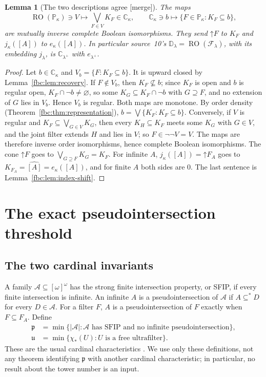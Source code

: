 \documentclass[11pt,letterpaper]{article}
\newtheorem{lemma}[theorem]{Lemma}
\theoremstyle{definition}
\theoremstyle{remark}
\newcommand{\om}{\omega}
\newcommand{\C}{\mathbb C}
\newcommand{\PP}{\mathbb P}
\newcommand{\cp}{\mathfrak p}
\newcommand{\cu}{\mathfrak u}
\newcommand{\up}{\mathord{\uparrow}}
\newcommand{\RO}{\operatorname{RO}}
\newcommand{\src}[1]{\textup{[#1]}}
\begin{document}
\begin{lemma}[The two descriptions agree \src{merge}]
\label{fbc:lem:dictionary}
The maps
\[
 \RO(\PP_\kappa)\ni V\longmapsto\bigvee_{F\in V}K_F\in\C_\kappa,
 \qquad
 \C_\kappa\ni b\longmapsto\{F\in\PP_\kappa:K_F\subseteq b\},
\]
are mutually inverse complete Boolean isomorphisms. They send $\up F$ to
$K_F$ and $j_\kappa([A])$ to $e_\kappa([A])$. In particular source~10's
$\mathbb D_\lambda=\RO(\mathcal F_\lambda)$, with its embedding
$j_\lambda$, is $\C_{\lambda^+}$ with $e_{\lambda^+}$.
\end{lemma}
\begin{proof}
Let $b\in\C_\kappa$ and $V_b=\{F:K_F\subseteq b\}$. It is upward closed
by Lemma~\ref{fbc:lem:recovery}. If $F\notin V_b$, then $K_F\nsubseteq b$;
since $K_F$ is open and $b$ is regular open, $K_F\cap\neg b\ne\varnothing$,
so some $K_G\subseteq K_F\cap\neg b$ with $G\supseteq F$, and no extension
of $G$ lies in $V_b$. Hence $V_b$ is regular. Both maps are monotone.
By order density (Theorem~\ref{fbc:thm:representation}),
$b=\bigvee\{K_F:K_F\subseteq b\}$. Conversely, if $V$ is regular and
$K_F\subseteq\bigvee_{G\in V}K_G$, then every $K_H\subseteq K_F$ meets
some $K_G$ with $G\in V$, and the joint filter extends $H$ and lies in
$V$; so $F\in\neg\neg V=V$. The maps are therefore inverse order
isomorphisms, hence complete Boolean isomorphisms. The cone $\up F$ goes
to $\bigvee_{G\supseteq F}K_G=K_F$. For infinite $A$,
$j_\kappa([A])=\up F_A$ goes to $K_{F_A}=\widehat{[A]}=e_\kappa([A])$, and
for finite $A$ both sides are $0$. The last sentence is
Lemma~\ref{fbc:lem:index-shift}.
\end{proof}

\section{The exact pseudointersection threshold}
\label{fbc:sec:p}

\subsection{The two cardinal invariants}
\label{fbc:sec:invariants}
A family $\mathcal A\subseteq[\om]^\om$ has the strong finite
intersection property, or SFIP, if every finite intersection is infinite.
An infinite $A$ is a pseudointersection of $\mathcal A$ if
$A\subseteq^*D$ for every $D\in\mathcal A$. For a filter $F$, $A$ is a
pseudointersection of $F$ exactly when $F\subseteq F_A$. Define
\[
 \begin{split}
 \cp&=\min\{|\mathcal A|:\mathcal A\text{ has SFIP and no infinite
 pseudointersection}\},\\
 \cu&=\min\{\chi_*(U):U\text{ is a free ultrafilter}\}.
 \end{split}
\]
These are the usual cardinal characteristics \cite{Blass}. We use only
these definitions, not any theorem identifying $\cp$ with another
cardinal characteristic; in particular, no result about the tower
number is an input.
\end{document}
